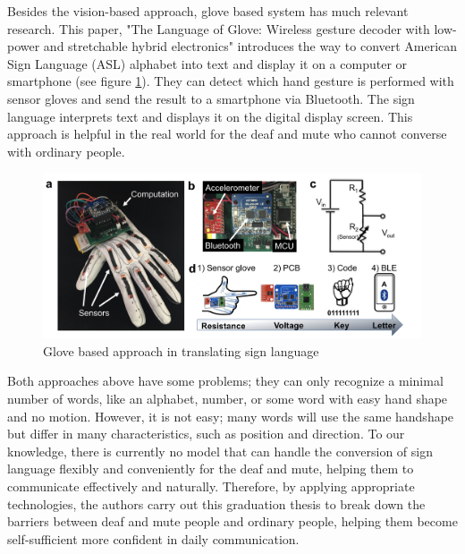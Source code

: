 Besides the vision-based approach, glove based system has much relevant research. This paper, "The Language of Glove: Wireless gesture decoder with low-power and stretchable hybrid electronics" \cite{o2017language} introduces the way to convert American Sign Language (ASL) alphabet into text and display it on a computer or smartphone (see figure \ref{fig:Chap2-Glove-Base}). They can detect which hand gesture is performed with sensor gloves and send the result to a smartphone via Bluetooth. The sign language interprets text and displays it on the digital display screen. This approach is helpful in the real world for the deaf and mute who cannot converse with ordinary people.

\begin{figure}[H]
  \centering
  \includegraphics[width=\textwidth]{img/Chap2/Glove-Based.png}
  \caption{Glove based approach in translating sign language}
  \label{fig:Chap2-Glove-Base}
\end{figure}

Both approaches above have some problems; they can only recognize a minimal number of words, like an alphabet, number, or some word with easy hand shape and no motion. However, it is not easy; many words will use the same handshape but differ in many characteristics, such as position and direction. To our knowledge, there is currently no model that can handle the conversion of sign language flexibly and conveniently for the deaf and mute, helping them to communicate effectively and naturally. Therefore, by applying appropriate technologies, the authors carry out this graduation thesis to break down the barriers between deaf and mute people and ordinary people, helping them become self-sufficient more confident in daily communication.

